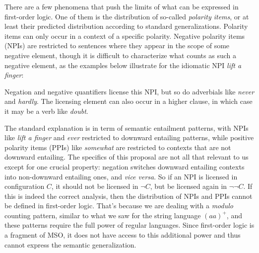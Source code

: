 There are a few phenomena that push the limits of what can be expressed in first-order logic.
One of them is the distribution of so-called \emph{polarity items}, or at least their predicted distribution according to standard generalizations.
Polarity items can only occur in a context of a specific polarity.
Negative polarity items (NPIs) are restricted to sentences where they appear in the scope of some negative element, though it is difficult to characterize what counts as such a negative element, as the examples below illustrate for the idiomatic NPI \emph{lift a finger}:
%
\begin{exe}
    \ex
    \begin{xlist}
    \end{xlist}
\end{exe}
%
Negation and negative quantifiers license this NPI, but so do adverbials like \emph{never} and \emph{hardly}.
The licensing element can also occur in a higher clause, in which case it may be a verb like \emph{doubt}.
%
\begin{exe}
    \ex
    \begin{xlist}
    \end{xlist}
\end{exe}

The standard explanation is in term of semantic entailment patterns, with NPIs like \emph{lift a finger} and \emph{ever} restricted to downward entailing patterns, while positive polarity items (PPIs) like \emph{somewhat} are restricted to contexts that are not downward entailing.
The specifics of this proposal are not all that relevant to us except for one crucial property: negation switches downward entailing contexts into non-downward entailing ones, and \emph{vice versa}.
So if an NPI is licensed in configuration $C$, it should not be licensed in $\neg C$, but be licensed again in $\neg \neg C$.
If this is indeed the correct analysis, then the distribution of NPIs and PPIs cannot be defined in first-order logic.
That's because we are dealing with a \emph{modulo} counting pattern, similar to what we saw for the string language $(aa)^+$, and these patterns require the full power of regular languages.
Since first-order logic is a fragment of MSO, it does not have access to this additional power and thus cannot express the semantic generalization.

